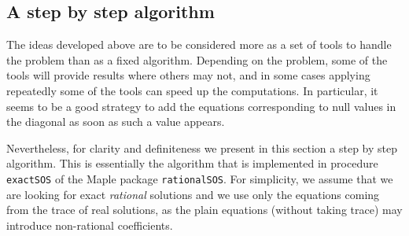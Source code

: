 \documentclass{amsart}
\theoremstyle{definition}
\theoremstyle{remark}
\numberwithin{equation}{section}
\begin{document}
\subsection{A step by step algorithm}

The ideas developed above are to be considered more as a set of tools to handle the problem than as a fixed algorithm. Depending on the problem, some of the tools will provide results where others may not, and in some cases applying repeatedly some of the tools can speed up the computations. In particular, it seems to be a good strategy to add the equations corresponding to null values in the diagonal as soon as such a value appears.

Nevertheless, for clarity and definiteness we present in this section a step by step algorithm. This is essentially the algorithm that is implemented in procedure \texttt{exactSOS} of the Maple package \texttt{rationalSOS}. For simplicity, we assume that we are looking for exact \emph{rational} solutions and we use only the equations coming from the trace of real solutions, as the plain equations (without taking trace) may introduce non-rational coefficients.
\end{document}
